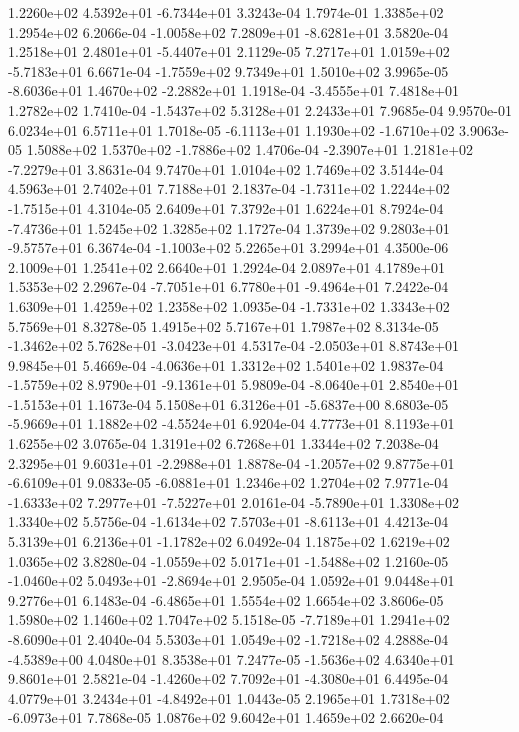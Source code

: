  1.2260e+02  4.5392e+01 -6.7344e+01  3.3243e-04
1.7974e-01 1.3385e+02 1.2954e+02  6.2066e-04
-1.0058e+02  7.2809e+01 -8.6281e+01  3.5820e-04
 1.2518e+01  2.4801e+01 -5.4407e+01  2.1129e-05
 7.2717e+01  1.0159e+02 -5.7183e+01  6.6671e-04
-1.7559e+02  9.7349e+01  1.5010e+02  3.9965e-05
-8.6036e+01  1.4670e+02 -2.2882e+01  1.1918e-04
-3.4555e+01  7.4818e+01  1.2782e+02  1.7410e-04
-1.5437e+02  5.3128e+01  2.2433e+01  7.9685e-04
9.9570e-01 6.0234e+01 6.5711e+01  1.7018e-05
-6.1113e+01  1.1930e+02 -1.6710e+02  3.9063e-05
 1.5088e+02  1.5370e+02 -1.7886e+02  1.4706e-04
-2.3907e+01  1.2181e+02 -7.2279e+01  3.8631e-04
9.7470e+01 1.0104e+02 1.7469e+02  3.5144e-04
4.5963e+01 2.7402e+01 7.7188e+01  2.1837e-04
-1.7311e+02  1.2244e+02 -1.7515e+01  4.3104e-05
2.6409e+01 7.3792e+01 1.6224e+01  8.7924e-04
-7.4736e+01  1.5245e+02  1.3285e+02  1.1727e-04
 1.3739e+02  9.2803e+01 -9.5757e+01  6.3674e-04
-1.1003e+02  5.2265e+01  3.2994e+01  4.3500e-06
2.1009e+01 1.2541e+02 2.6640e+01  1.2924e-04
2.0897e+01 4.1789e+01 1.5353e+02  2.2967e-04
-7.7051e+01  6.7780e+01 -9.4964e+01  7.2422e-04
1.6309e+01 1.4259e+02 1.2358e+02  1.0935e-04
-1.7331e+02  1.3343e+02  5.7569e+01  8.3278e-05
1.4915e+02 5.7167e+01 1.7987e+02  8.3134e-05
-1.3462e+02  5.7628e+01 -3.0423e+01  4.5317e-04
-2.0503e+01  8.8743e+01  9.9845e+01  5.4669e-04
-4.0636e+01  1.3312e+02  1.5401e+02  1.9837e-04
-1.5759e+02  8.9790e+01 -9.1361e+01  5.9809e-04
-8.0640e+01  2.8540e+01 -1.5153e+01  1.1673e-04
 5.1508e+01  6.3126e+01 -5.6837e+00  8.6803e-05
-5.9669e+01  1.1882e+02 -4.5524e+01  6.9204e-04
4.7773e+01 8.1193e+01 1.6255e+02  3.0765e-04
1.3191e+02 6.7268e+01 1.3344e+02  7.2038e-04
 2.3295e+01  9.6031e+01 -2.2988e+01  1.8878e-04
-1.2057e+02  9.8775e+01 -6.6109e+01  9.0833e-05
-6.0881e+01  1.2346e+02  1.2704e+02  7.9771e-04
-1.6333e+02  7.2977e+01 -7.5227e+01  2.0161e-04
-5.7890e+01  1.3308e+02  1.3340e+02  5.5756e-04
-1.6134e+02  7.5703e+01 -8.6113e+01  4.4213e-04
 5.3139e+01  6.2136e+01 -1.1782e+02  6.0492e-04
1.1875e+02 1.6219e+02 1.0365e+02  3.8280e-04
-1.0559e+02  5.0171e+01 -1.5488e+02  1.2160e-05
-1.0460e+02  5.0493e+01 -2.8694e+01  2.9505e-04
1.0592e+01 9.0448e+01 9.2776e+01  6.1483e-04
-6.4865e+01  1.5554e+02  1.6654e+02  3.8606e-05
1.5980e+02 1.1460e+02 1.7047e+02  5.1518e-05
-7.7189e+01  1.2941e+02 -8.6090e+01  2.4040e-04
 5.5303e+01  1.0549e+02 -1.7218e+02  4.2888e-04
-4.5389e+00  4.0480e+01  8.3538e+01  7.2477e-05
-1.5636e+02  4.6340e+01  9.8601e+01  2.5821e-04
-1.4260e+02  7.7092e+01 -4.3080e+01  6.4495e-04
 4.0779e+01  3.2434e+01 -4.8492e+01  1.0443e-05
 2.1965e+01  1.7318e+02 -6.0973e+01  7.7868e-05
1.0876e+02 9.6042e+01 1.4659e+02  2.6620e-04
